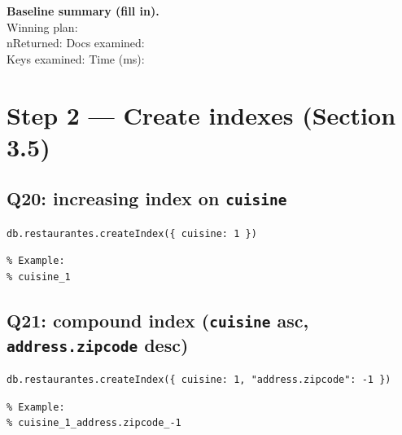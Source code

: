 \documentclass[11pt]{article}
\begin{document}
\begin{tcolorbox}
\textbf{Baseline summary (fill in).}\\
Winning plan: \underline{\hspace{5.5cm}} \\
nReturned: \underline{\hspace{3.5cm}} \quad
Docs examined: \underline{\hspace{3.5cm}} \\
Keys examined: \underline{\hspace{3.5cm}} \quad
Time (ms): \underline{\hspace{3.5cm}}
\end{tcolorbox}

\section{Step 2 — Create indexes (Section 3.5)}
\subsection{Q20: increasing index on \texttt{cuisine}}
\begin{cmd}
\begin{verbatim}
db.restaurantes.createIndex({ cuisine: 1 })
\end{verbatim}
\end{cmd}

\begin{out}
\begin{verbatim}
% Example:
% cuisine_1
\end{verbatim}
\end{out}

\subsection{Q21: compound index (\texttt{cuisine} asc, \texttt{address.zipcode} desc)}
\begin{cmd}
\begin{verbatim}
db.restaurantes.createIndex({ cuisine: 1, "address.zipcode": -1 })
\end{verbatim}
\end{cmd}

\begin{out}
\begin{verbatim}
% Example:
% cuisine_1_address.zipcode_-1
\end{verbatim}
\end{out}
\end{document}

